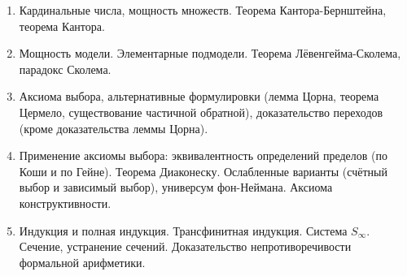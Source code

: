 \documentclass[11pt,a4paper,oneside]{scrartcl}
\begin{document}
\begin{enumerate}
\item Кардинальные числа, мощность множеств. Теорема Кантора-Бернштейна, теорема Кантора. 
\item Мощность модели. Элементарные подмодели. Теорема Лёвенгейма-Сколема, парадокс Сколема.
\item Аксиома выбора, альтернативные формулировки (лемма Цорна, теорема Цермело, существование
частичной обратной), доказательство переходов (кроме доказательства леммы Цорна).
\item Применение аксиомы выбора: эквивалентность определений пределов (по Коши и по Гейне).
Теорема Диаконеску. Ослабленные варианты (счётный выбор и зависимый выбор), универсум фон-Неймана.
Аксиома конструктивности.
\item Индукция и полная индукция. Трансфинитная индукция. Система $S_\infty$. 
Сечение, устранение сечений. Доказательство непротиворечивости формальной арифметики.
\end{enumerate}
\end{document}
